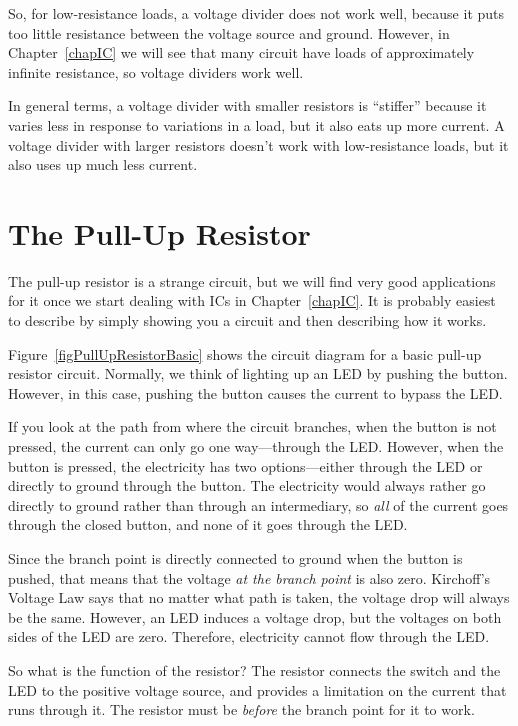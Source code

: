 So, for low-resistance loads, a voltage divider does not work well, because it puts too little resistance between the voltage source and ground.
However, in Chapter~\ref{chapIC} we will see that many circuit have loads of approximately infinite resistance, so voltage dividers work well.

In general terms, a voltage divider with smaller resistors is ``stiffer'' because it varies less in response to variations in a load, but it also eats up more current.
A voltage divider with larger resistors doesn't work with low-resistance loads, but it also uses up much less current.

\section{The Pull-Up Resistor}
\label{secPullUpResistor}

The pull-up resistor is a strange circuit, but we will find very good applications for it once we start dealing with ICs in Chapter~\ref{chapIC}.
It is probably easiest to describe by simply showing you a circuit and then describing how it works.


Figure~\ref{figPullUpResistorBasic} shows the circuit diagram for a basic pull-up resistor circuit.
Normally, we think of lighting up an LED by pushing the button.
However, in this case, pushing the button causes the current to bypass the LED.

If you look at the path from where the circuit branches, when the button is not pressed, the current can only go one way---through the LED.
However, when the button is pressed, the electricity has two options---either through the LED or directly to ground through the button.
The electricity would always rather go directly to ground rather than through an intermediary, so \emph{all} of the current goes through the closed button, and none of it goes through the LED.

Since the branch point is directly connected to ground when the button is pushed, that means that the voltage \emph{at the branch point} is also zero.
Kirchoff's Voltage Law says that no matter what path is taken, the voltage drop will always be the same.
However, an LED induces a voltage drop, but the voltages on both sides of the LED are zero.
Therefore, electricity cannot flow through the LED.

So what is the function of the resistor?
The resistor connects the switch and the LED to the positive voltage source, and provides a limitation on the current that runs through it.
The resistor must be \emph{before} the branch point for it to work.

